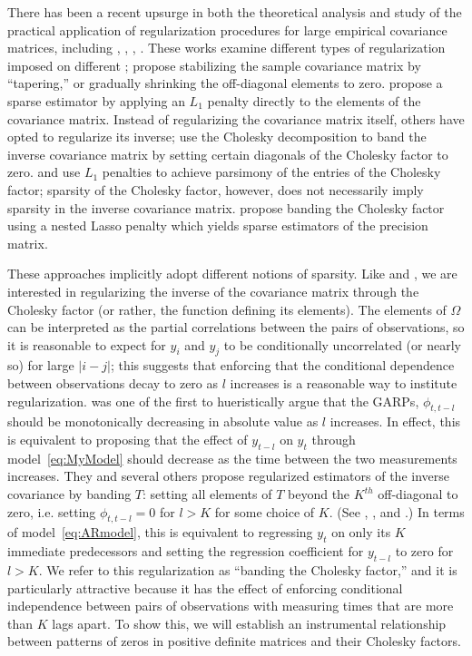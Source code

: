 \documentclass[12pt]{article}
\theoremstyle{definition}
\begin{document}
There has been a recent upsurge in both the theoretical analysis and study of the practical application of regularization procedures for large empirical covariance matrices, including \citet{huang2006covariance}, \citet{furrer2007estimation}, \citet{fan2008high}, \citet{ledoit2004well}. These works examine different types of regularization imposed on different ; \citet{furrer2007estimation} propose stabilizing the sample covariance matrix by ``tapering,'' or gradually shrinking the off-diagonal elements to zero. \citet{d2008first} propose a sparse estimator by applying an $L_1$ penalty directly to the elements of the covariance matrix. Instead of regularizing the covariance matrix itself, others have opted to regularize its inverse;  \cite{wu2003nonparametric} use the Cholesky decomposition to band the inverse covariance matrix by setting certain diagonals of the Cholesky factor to zero. \citet{huang2006covariance} and \citet{levina2008sparse} use $L_1$ penalties to achieve parsimony of the entries of the Cholesky factor; sparsity of the Cholesky factor, however, does not necessarily imply sparsity in the inverse covariance matrix. \citet{levina2008sparse} propose banding the Cholesky factor using a nested Lasso penalty which yields sparse estimators of the precision matrix.  

These approaches implicitly adopt different notions of sparsity. Like \citet{huang2006covariance} and \citet{levina2008sparse}, we are interested in regularizing the inverse of the covariance matrix through the Cholesky factor (or rather, the function defining its elements). The elements of $\Omega$ can be interpreted as the partial correlations between the pairs of observations, so it is reasonable to expect for $y_i$ and $y_j$ to be conditionally uncorrelated (or nearly so) for large $\vert i-j \vert$; this suggests that enforcing that the conditional dependence between observations decay to zero as $l$ increases is a reasonable way to institute regularization. \cite{pourahmadi1999joint} was one of the first to hueristically argue that the GARPs, $\phi_{t,t-l}$ should be monotonically decreasing in absolute value as $l$ increases. In effect, this is equivalent to proposing that the effect of $y_{t-l}$ on $y_t$ through model~\ref{eq:MyModel} should decrease as the time between the two measurements increases. They and several others propose regularized estimators of the inverse covariance by banding $T$: setting all elements of $T$ beyond the $K^{th}$ off-diagonal to zero, i.e. setting $\phi_{t,t-l}=0$ for $l > K$ for some choice of $K$.  (See \citet{wu2003nonparametric}, \cite{bickel2008regularized}, and \cite{huang2007estimation}.) In terms of model~\ref{eq:ARmodel}, this is equivalent to regressing $y_t$  on only its $K$ immediate predecessors and setting the regression coefficient for $y_{t-l}$ to zero for $l>K$. We refer to this regularization as ``banding the Cholesky factor,'' and it is particularly attractive because it has the effect of enforcing conditional independence between pairs of observations with measuring times that are more than $K$ lags apart. To show this, we will establish an instrumental relationship between patterns of zeros in positive definite matrices and their Cholesky factors.  
\end{document}
